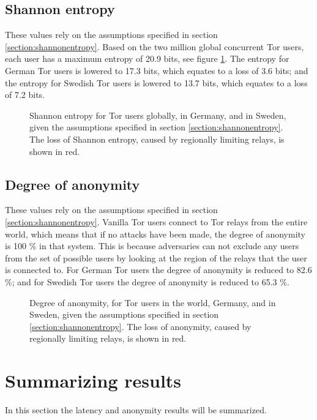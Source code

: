 \documentclass{kththesis}
\begin{document}
\subsection{Shannon entropy}
These values rely on the assumptions specified in section \ref{section:shannonentropy}. Based on the two million global concurrent Tor users, each user has a maximum entropy of 20.9 bits, see figure \ref{fig:entropy}. The entropy for German Tor users is lowered to 17.3 bits, which equates to a loss of 3.6 bits; and the entropy for Swedish Tor users is lowered to 13.7 bits, which equates to a loss of 7.2 bits. 

\begin{figure}[htbp]
  \centering
  
  \caption{Shannon entropy for Tor users globally, in Germany, and in Sweden, given the assumptions specified in section \ref{section:shannonentropy}. The loss of Shannon entropy, caused by regionally limiting relays, is shown in red.}
  \label{fig:entropy}
\end{figure}

\subsection{Degree of anonymity}
These values rely on the assumptions specified in section \ref{section:shannonentropy}. Vanilla Tor users connect to Tor relays from the entire world, which means that if no attacks have been made, the degree of anonymity is 100 \% in that system. This is because adversaries can not exclude any users from the set of possible users by looking at the region of the relays that the user is connected to. For German Tor users the degree of anonymity is reduced to 82.6 \%; and for Swedish Tor users the degree of anonymity is reduced to 65.3 \%.

\begin{figure}[htbp]
  \centering
  
  \caption{Degree of anonymity, for Tor users in the world, Germany, and in Sweden, given the assumptions specified in section \ref{section:shannonentropy}. The loss of anonymity, caused by regionally limiting relays, is shown in red.}
  \label{fig:degreeOfAnonymity}
\end{figure}

\section{Summarizing results}
In this section the latency and anonymity results will be summarized.
\end{document}
